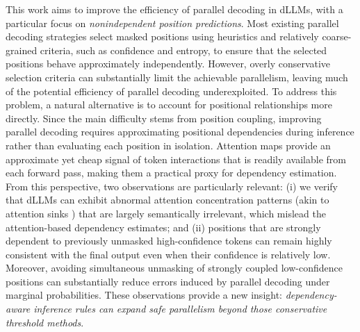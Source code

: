 This work aims to improve the efficiency of parallel decoding in dLLMs, with a particular focus on \textit{nonindependent position predictions}. Most existing parallel decoding strategies \cite{fastdllm, ebsampler} select masked positions using heuristics and relatively coarse-grained criteria, such as confidence and entropy, to ensure that the selected positions behave approximately independently. However, overly conservative selection criteria can substantially limit the achievable parallelism, leaving much of the potential efficiency of parallel decoding underexploited. To address this problem, a natural alternative is to account for positional relationships more directly. Since the main difficulty stems from position coupling, improving parallel decoding requires approximating positional dependencies during inference rather than evaluating each position in isolation. Attention maps \cite{spargeattn, sageattention} provide an approximate yet cheap signal of token interactions that is readily available from each forward pass, making them a practical proxy for dependency estimation. From this perspective, two observations are particularly relevant: (i) we verify that dLLMs can exhibit abnormal attention concentration patterns (akin to attention sinks \cite{streamllm, attentionsinksdiffusionlanguage}) that are largely semantically irrelevant, which mislead the attention-based dependency estimates; and (ii) positions that are strongly dependent to previously unmasked high-confidence tokens can remain highly consistent with the final output even when their confidence is relatively low. Moreover, 
avoiding simultaneous unmasking of strongly coupled low-confidence positions can substantially reduce errors induced by parallel decoding under marginal probabilities. These observations provide a new insight: \textit{dependency-aware inference rules can expand safe parallelism beyond those conservative threshold methods}.


